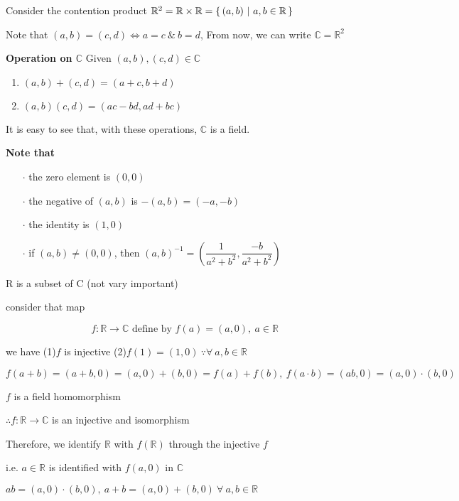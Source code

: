 Consider the contention product $\mathbb R^2 = \mathbb R \times \mathbb R = \left\{ \,(a,b)~|~a,b\in \mathbb R \,\right\}$

Note that $(a,b) = (c,d) \Leftrightarrow a=c ~\&~ b = d$, From now, we can write $\mathbb C = \mathbb R^2 $

\begin{tcolorbox}
	\textbf{Operation on $\mathbb C$}
	Given $(a,b),(c,d) \in \mathbb C$

	\begin{enumerate}
		\item $(a,b)+(c,d) = (a+c,b+d)$
		\item $(a,b)(c,d) = (ac-bd,ad+bc)$
	\end{enumerate}
	
	It is easy to see that, with these operations, $\mathbb C$ is a field.
\end{tcolorbox}

\newpage

\textbf{Note that}
\begin{enumerate}
	\item[$\cdot$] the zero element is $(0,0)$
	\item[$\cdot$] the negative of $(a,b)$ is $-(a,b) = (-a,-b)$
	\item[$\cdot$] the identity is $(1,0)$
	\item[$\cdot$] if $(a,b) \neq (0,0)$, then $(a,b)^{-1} = \left(\dfrac{1}{a^2+b^2},\dfrac{-b}{a^2+b^2}\right)$
\end{enumerate}


\begin{tcolorbox}
	R is a subset of C \color{blue}(not vary important)\color{black}
	
	consider that map
	
	$$f:\mathbb R \rightarrow \mathbb C \text{ define by } f(a) = (a,0),~a \in \mathbb R$$
	
	we have (1)$f$ is injective (2)$f(1) = (1,0)~ \because \forall~a,b \in \mathbb R$
	
	$f(a+b) = (a+b,0) = (a,0)+(b,0) = f(a) + f(b),~f(a\cdot b) = (ab,0) = (a,0) \cdot (b,0)$
	
	$f$ is a field homomorphism
	
	$\therefore f:\mathbb R \rightarrow \mathbb C$ is an injective and isomorphism
	
	Therefore, we identify $\mathbb R$ with $f(\mathbb R)$ through the injective $f$ 
	
	i.e. $a \in \mathbb R$ is identified with $f(a,0)$ in $\mathbb C$
	
	$ab = (a,0)\cdot(b,0),~a+b = (a,0)+(b,0) ~\forall~a,b\in \mathbb R$
	
\end{tcolorbox}

